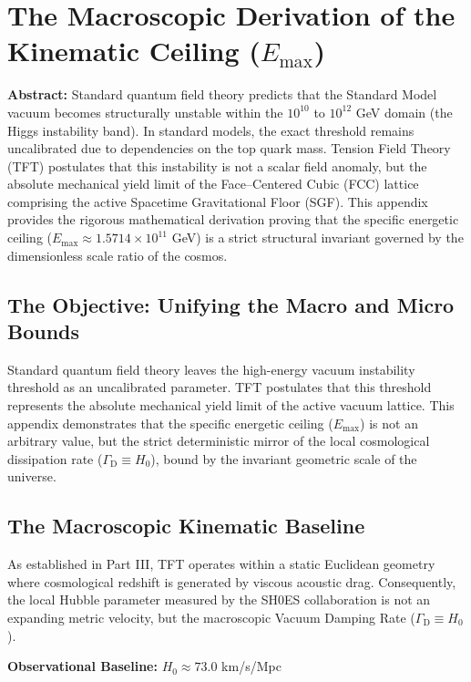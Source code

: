 \chapter{The Macroscopic Derivation of the Kinematic Ceiling ($E_{\mathrm{max}}$)}
\label{app:kinematic_ceiling}

\noindent\textbf{Abstract:} Standard quantum field theory predicts that the Standard Model vacuum becomes structurally unstable within the $10^{10}$ to $10^{12}$ GeV domain (the Higgs instability band). In standard models, the exact threshold remains uncalibrated due to dependencies on the top quark mass. Tension Field Theory (TFT) postulates that this instability is not a scalar field anomaly, but the absolute mechanical yield limit of the Face--Centered Cubic (FCC) lattice comprising the active Spacetime Gravitational Floor (SGF). This appendix provides the rigorous mathematical derivation proving that the specific energetic ceiling ($E_{\mathrm{max}} \approx 1.5714 \times 10^{11}$ GeV) is a strict structural invariant governed by the dimensionless scale ratio of the cosmos.

\section{The Objective: Unifying the Macro and Micro Bounds}
Standard quantum field theory leaves the high-energy vacuum instability threshold as an uncalibrated parameter. TFT postulates that this threshold represents the absolute mechanical yield limit of the active vacuum lattice. This appendix demonstrates that the specific energetic ceiling ($E_{\mathrm{max}}$) is not an arbitrary value, but the strict deterministic mirror of the local cosmological dissipation rate ($\Gamma_{\mathrm{D}} \equiv H_0$), bound by the invariant geometric scale of the universe.

\section{The Macroscopic Kinematic Baseline}
As established in Part III, TFT operates within a static Euclidean geometry where cosmological redshift is generated by viscous acoustic drag. Consequently, the local Hubble parameter measured by the SH0ES collaboration is not an expanding metric velocity, but the macroscopic Vacuum Damping Rate ($\Gamma_{\mathrm{D}} \equiv H_0$).

\noindent\textbf{Observational Baseline:} $H_0 \approx 73.0$ km/s/Mpc


